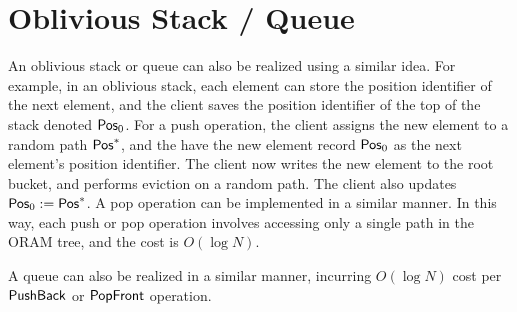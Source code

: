 \documentclass[11pt]{article}
\begin{document}
\section{Oblivious Stack / Queue}
An oblivious stack or queue can also be realized
using a similar idea.
For example, in an oblivious stack,
each element can store the position identifier
of the next element, and the client saves
the position identifier of the top of the stack denoted ${\sf Pos}_0$.
For a push operation, the client 
assigns the new element to a random path ${\sf Pos}^*$, 
and the have the new element record
${\sf Pos}_0$ as the next element's position identifier. 
The client now writes the new element to the root bucket,
and performs eviction on a random path.
The client also updates ${\sf Pos}_0 := {\sf Pos}^*$.
A pop operation can be implemented in a similar manner.
In this 
way, 
each push or pop operation involves
accessing only a single path in the ORAM tree,
and the cost is $O(\log N)$.


A queue can also be realized in a similar
manner, incurring $O(\log N)$ cost per ${\sf PushBack}$ or
${\sf PopFront}$ operation.
\end{document}
